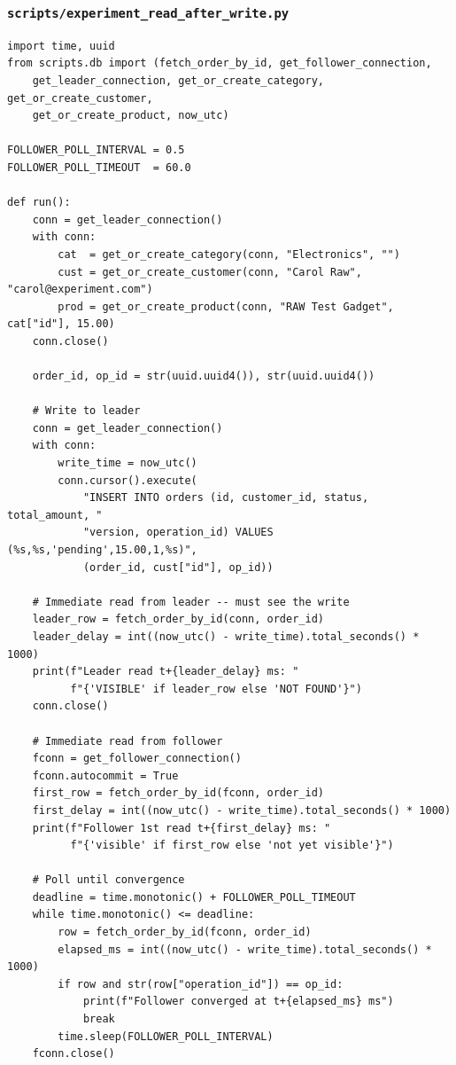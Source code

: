 \documentclass[12pt,a4paper]{article}
\begin{document}
\subsubsection{\texttt{scripts/experiment\_read\_after\_write.py}}
\begin{lstlisting}[style=pythonstyle]
import time, uuid
from scripts.db import (fetch_order_by_id, get_follower_connection,
    get_leader_connection, get_or_create_category, get_or_create_customer,
    get_or_create_product, now_utc)

FOLLOWER_POLL_INTERVAL = 0.5
FOLLOWER_POLL_TIMEOUT  = 60.0

def run():
    conn = get_leader_connection()
    with conn:
        cat  = get_or_create_category(conn, "Electronics", "")
        cust = get_or_create_customer(conn, "Carol Raw", "carol@experiment.com")
        prod = get_or_create_product(conn, "RAW Test Gadget", cat["id"], 15.00)
    conn.close()

    order_id, op_id = str(uuid.uuid4()), str(uuid.uuid4())

    # Write to leader
    conn = get_leader_connection()
    with conn:
        write_time = now_utc()
        conn.cursor().execute(
            "INSERT INTO orders (id, customer_id, status, total_amount, "
            "version, operation_id) VALUES (%s,%s,'pending',15.00,1,%s)",
            (order_id, cust["id"], op_id))

    # Immediate read from leader -- must see the write
    leader_row = fetch_order_by_id(conn, order_id)
    leader_delay = int((now_utc() - write_time).total_seconds() * 1000)
    print(f"Leader read t+{leader_delay} ms: "
          f"{'VISIBLE' if leader_row else 'NOT FOUND'}")
    conn.close()

    # Immediate read from follower
    fconn = get_follower_connection()
    fconn.autocommit = True
    first_row = fetch_order_by_id(fconn, order_id)
    first_delay = int((now_utc() - write_time).total_seconds() * 1000)
    print(f"Follower 1st read t+{first_delay} ms: "
          f"{'visible' if first_row else 'not yet visible'}")

    # Poll until convergence
    deadline = time.monotonic() + FOLLOWER_POLL_TIMEOUT
    while time.monotonic() <= deadline:
        row = fetch_order_by_id(fconn, order_id)
        elapsed_ms = int((now_utc() - write_time).total_seconds() * 1000)
        if row and str(row["operation_id"]) == op_id:
            print(f"Follower converged at t+{elapsed_ms} ms")
            break
        time.sleep(FOLLOWER_POLL_INTERVAL)
    fconn.close()
\end{lstlisting}
\end{document}
